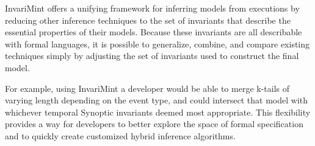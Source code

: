 InvariMint offers a unifying framework for inferring models from executions by 
reducing other inference techniques to the set of invariants
that describe the essential properties of their models. Because these invariants
are all describable with formal languages,
it is possible to generalize, combine, and compare existing
techniques simply by adjusting the set of invariants used to construct the final
model.

For example, using InvariMint a developer would be able to merge k-tails of
varying length depending on the event type, and could intersect that model with
whichever temporal Synoptic invariants deemed most appropriate. This flexibility
provides a way for developers to better explore the space of formal
specification and to quickly create customized hybrid inference algorithms.
